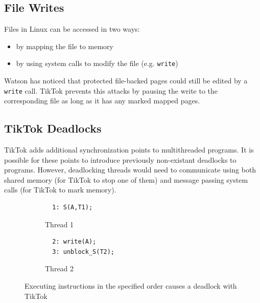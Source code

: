\subsection{File Writes}
\label{subsec:filewrites}
Files in Linux can be accessed in two ways:
\begin{itemize}
    \item by mapping the file to memory
    \item by using system calls to modify the file (e.g. \texttt{write})
\end{itemize}

Watson has noticed that protected file-backed pages could still be edited by a 
\texttt{write} call. TikTok prevents this attacks by pausing the write to the 
corresponding file as long as it has any marked mapped pages.

\subsection{TikTok Deadlocks}
\label{subsec:deadlocks}
TikTok adds additional synchronization points to multithreaded programs. It is 
possible for these points to introduce previously non-existant deadlocks to 
programs. However, deadlocking threads would need to communicate using both 
shared memory (for TikTok to stop one of them) and message passing system calls 
(for TikTok to mark memory).


\begin{figure}
  \centering
  \begin{subfigure}[b]{0.45\linewidth}
  \begin{minipage}{\linewidth}
  \begin{lstlisting}
  1: S(A,T1);  
  \end{lstlisting}
  \end{minipage}
  \caption{Thread 1}
  \end{subfigure}
  \hfill
  \begin{subfigure}[b]{0.45\linewidth}
  \begin{minipage}{\linewidth}
  \begin{lstlisting}
  2: write(A);
  3: unblock_S(T2);
  \end{lstlisting}  
  \end{minipage}
  \caption{Thread 2}
  \end{subfigure}
  \caption{Executing instructions in the specified order causes a deadlock with TikTok}
  \label{fig:deadlock}
\end{figure}


